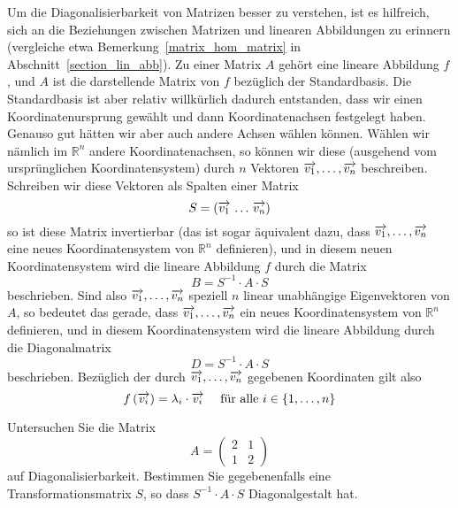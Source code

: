 \begin{notiz}\label{ew_lin_abbild_diag} Um die Diagonalisierbarkeit von Matrizen besser zu verstehen, ist es 
hilfreich, sich an die Beziehungen zwischen Matrizen und linearen Abbildungen zu erinnern (vergleiche etwa 
Bemerkung~\ref{matrix_hom_matrix} in Abschnitt~\ref{section_lin_abb}). Zu einer Matrix $A$ gehört eine lineare
Abbildung $f$, und $A$ ist die darstellende Matrix von $f$ bezüglich der Standardbasis. Die Standardbasis ist 
aber relativ willkürlich dadurch entstanden, dass wir einen Koordinatenursprung gewählt und dann 
Koordinatenachsen festgelegt haben. Genauso gut hätten wir aber auch andere Achsen wählen können.  
Wählen wir nämlich im $\mathbb R^n$ andere Koordinatenachsen, so können 
wir diese (ausgehend vom ursprünglichen Koordinatensystem) durch $n$ Vektoren $\overrightarrow{v_1}, \ldots , 
\overrightarrow{v_n}$ beschreiben. Schreiben wir diese Vektoren als Spalten einer Matrix
  	$$ S = \left( \overrightarrow{v_1} \, \ldots \, \overrightarrow{v_n} \right) $$
so ist diese Matrix invertierbar (das ist sogar äquivalent dazu, dass $\overrightarrow{v_1}, \ldots , 
\overrightarrow{v_n}$ eine neues Koordinatensystem von $\mathbb R^n$ definieren), und in diesem neuen 
Koordinatensystem wird die lineare Abbildung $f$ durch die Matrix
  	$$ B = S^{-1} \cdot A \cdot S $$
beschrieben. Sind also $\overrightarrow{v_1}, \ldots , \overrightarrow{v_n}$ speziell $n$ linear 
unabhängige Eigenvektoren von $A$, so bedeutet das gerade, dass $\overrightarrow{v_1}, \ldots , 
\overrightarrow{v_n}$ ein neues Koordinatensystem von $\mathbb R^n$ definieren, und in diesem 
Koordinatensystem wird die lineare Abbildung durch die Diagonalmatrix
  	$$ D = S^{-1} \cdot A \cdot S $$
beschrieben. Bezüglich der durch $\overrightarrow{v_1}, \ldots , \overrightarrow{v_n}$ gegebenen Koordinaten 
gilt also 
  	$$ f \left( \overrightarrow{v_i} \right) = \lambda_i \cdot \overrightarrow{v_i} \quad \textrm{ für alle } i \in 
   	\{ 1, \ldots, n \} $$
\end{notiz}

\bigbreak
\bigbreak

\begin{aufgabe} Untersuchen Sie die Matrix
  	$$ A =  \left( \begin{matrix} 2 & 1 \\ 1 & 2 \end{matrix} \right) $$
auf Diagonalisierbarkeit. Bestimmen Sie gegebenenfalls eine Transformationsmatrix $S$, so dass $S^{-1} \cdot A \cdot S$ 
Diagonalgestalt hat.
\end{aufgabe}

